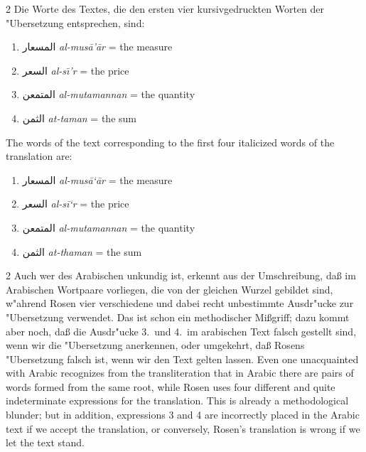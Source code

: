 \documentclass[10pt,a4paper]{article}
\renewcommand{\switchcolumn}{\syncronize\nointerlineskip\columnbreak}
\newcommand{\RL}[1]{\beginR#1\endR}
\newcommand{\ar}[1]{{\arabicfont\RL{#1}}}
\begin{document}
\begin{paracol}{2}
Die Worte des Textes, die den ersten vier kursivgedruckten Worten der "Ubersetzung entsprechen, sind:
\begin{enumerate}
\item \ar{المسعار} \textit{al-mus\=a'\=ar} = the measure
\item \ar{السعر} \textit{al-s\=\i'r} = the price
\item \ar{المتمعن} \textit{al-mutamannan} = the quantity
\item \ar{الثمن} \textit{at-taman} = the sum
\end{enumerate}
\switchcolumn
The words of the text corresponding to the first four italicized words of the translation are:
\begin{enumerate}
\item \ar{المسعار} \textit{al-mus\=a`\=ar} = the measure
\item \ar{السعر} \textit{al-s\={i}`r} = the price
\item \ar{المتمعن} \textit{al-mutamannan} = the quantity
\item \ar{الثمن} \textit{at-thaman} = the sum
\end{enumerate}
\end{paracol}

\begin{paracol}{2}
Auch wer des Arabischen unkundig ist, erkennt aus der Umschreibung, da\ss{} im Arabischen Wortpaare vorliegen, die von der gleichen Wurzel gebildet sind, w"ahrend Rosen vier verschiedene und dabei recht unbestimmte Ausdr"ucke zur "Ubersetzung verwendet. Das ist schon ein methodischer Mi\ss{}griff; dazu kommt aber noch, da\ss{} die Ausdr"ucke 3.\ und 4.\ im arabischen Text falsch gestellt sind, wenn wir die "Ubersetzung anerkennen, oder umgekehrt, da\ss{} Rosens "Ubersetzung falsch ist, wenn wir den Text gelten lassen.
\switchcolumn
Even one unacquainted with Arabic recognizes from the transliteration that in Arabic there are pairs of words formed from the same root, while Rosen uses four different and quite indeterminate expressions for the translation. This is already a methodological blunder; but in addition, expressions 3 and 4 are incorrectly placed in the Arabic text if we accept the translation, or conversely, Rosen's translation is wrong if we let the text stand.
\end{paracol}
\end{document}
